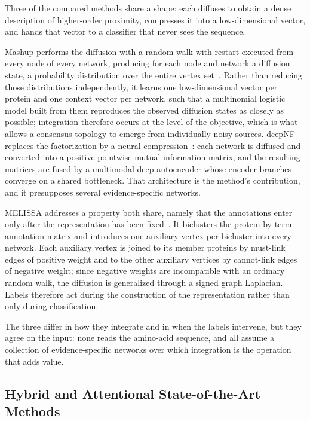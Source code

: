 \documentclass[Ingles]{ic-tese-v3}
\begin{document}
Three of the compared methods share a shape: each diffuses to obtain a dense description of
higher-order proximity, compresses it into a low-dimensional vector, and hands that vector to a
classifier that never sees the sequence.

Mashup performs the diffusion with a random walk with restart executed from every node of every
network, producing for each node and network a diffusion state, a probability distribution over the
entire vertex set~\cite{cho2016compact}. Rather than reducing those distributions independently, it
learns one low-dimensional vector per protein and one context vector per network, such that a
multinomial logistic model built from them reproduces the observed diffusion states as closely as
possible; integration therefore occurs at the level of the objective, which is what allows a
consensus topology to emerge from individually noisy sources. deepNF replaces the factorization by a
neural compression~\cite{deepnf}: each network is diffused and converted into a
positive pointwise mutual information matrix, and the resulting matrices are fused by a multimodal
deep autoencoder whose encoder branches converge on a shared bottleneck. That architecture is the
method's contribution, and it presupposes several evidence-specific networks.

MELISSA addresses a property both share, namely that the annotations enter only after the
representation has been fixed~\cite{wu2024melissa}. It biclusters the protein-by-term annotation
matrix and introduces one auxiliary vertex per bicluster into every network. Each auxiliary vertex is
joined to its member proteins by must-link edges of positive weight and to the other auxiliary
vertices by cannot-link edges of negative weight; since negative weights are incompatible with an
ordinary random walk, the diffusion is generalized through a signed graph Laplacian. Labels therefore
act during the construction of the representation rather than only during classification.

The three differ in how they integrate and in when the labels intervene, but they agree on the input:
none reads the amino-acid sequence, and all assume a collection of evidence-specific networks over
which integration is the operation that adds value.

\subsection{Hybrid and Attentional State-of-the-Art Methods}
\label{sec:rel_hibridos_comp}
\end{document}
